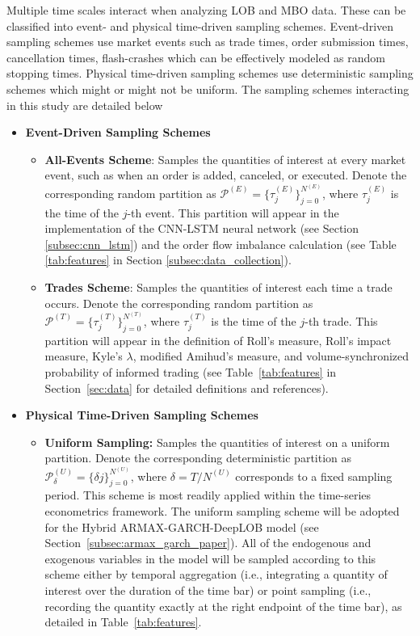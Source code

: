 \documentclass[10pt,a4paper,oneside]{article}
\begin{document}
Multiple time scales interact when analyzing LOB and MBO data. These can be classified into event- and physical time-driven sampling schemes. Event-driven sampling schemes use market events such as trade times, order submission times, cancellation times, flash-crashes which can be effectively modeled as random stopping times. Physical time-driven sampling schemes use deterministic sampling schemes which might or might not be uniform. The sampling schemes interacting in this study are detailed below

\begin{itemize}
    \item \textbf{Event-Driven Sampling Schemes}
          \begin{itemize}
              \item \textbf{All-Events Scheme}: Samples the quantities of interest at every market event, such as when an order is added, canceled, or executed. Denote the corresponding random partition as $\mathcal{P}^{(E)} = \{\tau^{(E)}_j\}_{j=0}^{N^{(E)}}$, where $\tau^{(E)}_j$ is the time of the $j$-th event. This partition will appear in the implementation of the CNN-LSTM neural network (see Section \ref{subsec:cnn_lstm}) and the order flow imbalance calculation (see Table \ref{tab:features} in Section \ref{subsec:data_collection}).
              \item \textbf{Trades Scheme}: Samples the quantities of interest each time a trade occurs. Denote the corresponding random partition as $\mathcal{P}^{(T)} = \{\tau^{(T)}_j\}_{j=0}^{N^{(T)}}$, where $\tau^{(T)}_j$ is the time of the $j$-th trade. This partition will appear in the definition of Roll's measure, Roll's impact measure, Kyle's $\lambda$, modified Amihud's measure, and volume-synchronized probability of informed trading (see Table~\ref{tab:features} in Section~\ref{sec:data} for detailed definitions and references).
          \end{itemize}
    \item \textbf{Physical Time-Driven Sampling Schemes}
        \begin{itemize}
            \item \textbf{Uniform Sampling:} Samples the quantities of interest on a uniform partition. Denote the corresponding deterministic partition as $\mathcal{P}^{(U)}_{\delta} = \{\delta j\}_{j=0}^{N^{(U)}}$, where $\delta = T / N^{(U)}$ corresponds to a fixed sampling period. This scheme is most readily applied within the time-series econometrics framework. The uniform sampling scheme will be adopted for the Hybrid ARMAX-GARCH-DeepLOB model (see Section~\ref{subsec:armax_garch_paper}). All of the endogenous and exogenous variables in the model will be sampled according to this scheme either by temporal aggregation (i.e., integrating a quantity of interest over the duration of the time bar) or point sampling (i.e., recording the quantity exactly at the right endpoint of the time bar), as detailed in Table~\ref{tab:features}.
        \end{itemize}
\end{itemize}
\end{document}
